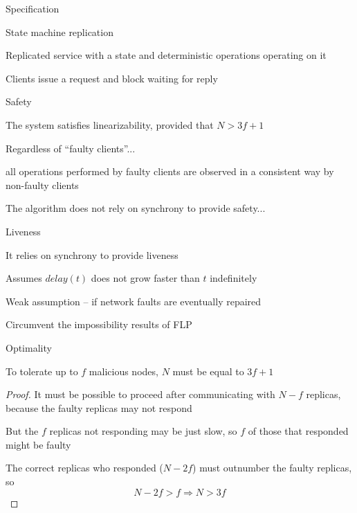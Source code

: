 \begin{frame}{Specification}

\BIL
\item State machine replication
\BI
\item Replicated service with a state and deterministic operations operating on it
\item Clients issue a request and block waiting for reply
\EI
\item Safety
\BI
\item The system satisfies linearizability, provided that $N>3f+1$
\item Regardless of “faulty clients”... 
	\BI
	\item all operations performed by faulty clients are observed in a consistent way by non-faulty clients
	\EI
\item The algorithm does not rely on synchrony to provide safety...
\EI
\item Liveness
\BI
\item It relies on synchrony to provide liveness
\item Assumes $\mathit{delay}(t)$ does not grow faster than $t$ indefinitely
\item Weak assumption – if network faults are eventually repaired
\item Circumvent the impossibility results of FLP
\EI
\EIL
\end{frame}


\begin{frame}{Optimality}
	
\begin{theorem}
To tolerate up to $f$ malicious nodes, $N$ must be equal to $3f+1$
\end{theorem}
	
\bigskip
\begin{proof}
\BIL
\pause
\item It must be possible to proceed after communicating with $N-f$ replicas,
because the faulty replicas may not respond
\pause
\item But the $f$ replicas not responding may be just slow, so $f$ of those
that responded might be faulty
\pause
\item The correct replicas who responded ($N-2f$) must outnumber 
the faulty replicas, so
\[
  N-2f > f \Rightarrow N > 3f
\]
\EIL
\end{proof}
		
\end{frame}

